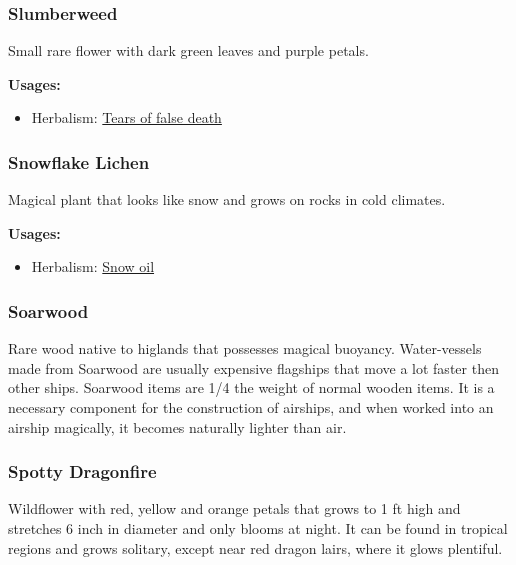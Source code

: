 \subsubsection{Slumberweed}
\label{Slumberweed}

Small rare flower with dark green leaves and purple petals.

\vspace{5mm}

\textbf{Usages:}

\begin{itemize}[noitemsep]
\item[] Herbalism: \hyperref[Tears of false death]{Tears of false death}
\end{itemize}

\subsubsection{Snowflake Lichen}
\label{Snowflake Lichen}

Magical plant that looks like snow and grows on rocks in cold climates.

\vspace{5mm}

\textbf{Usages:}

\begin{itemize}[noitemsep]
\item[] Herbalism: \hyperref[Snow oil]{Snow oil}
\end{itemize}

\subsubsection{Soarwood}

Rare wood native to higlands that possesses magical buoyancy. Water-vessels made from Soarwood are usually expensive flagships that move a lot faster then other ships. Soarwood items are 1/4 the weight of normal wooden items. It is a necessary component for the construction of airships, and when worked into an airship magically, it becomes naturally lighter than air.

\subsubsection{Spotty Dragonfire}
\label{Spotty Dragonfire}

Wildflower with red, yellow and orange petals that grows to 1 ft high and stretches 6 inch in diameter and only blooms at night. It can be found in tropical regions and grows solitary, except near red dragon lairs, where it glows plentiful.

